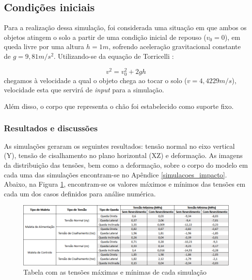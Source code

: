 \subsection{Condições iniciais}

\par Para a realização dessa simulação, foi considerada uma situação em que ambos os objetos atingem o solo a partir de uma condição inicial de repouso ($v_0 = 0$), em queda livre por uma altura $h = 1m$, sofrendo aceleração gravitacional constante de $g = 9,81 m/s^2$. Utilizando-se da equação de Torricelli \cite{hughd.young;rogera.freedman2008}:

\begin{equation}
    v^2 = v_0^2 + 2gh
\end{equation}
chegamos à velocidade a qual o objeto chega ao tocar o solo ($v = 4,4229 m/s$), velocidade esta que servirá de \textit{input} para a simulação.
\par Além disso, o corpo que representa o chão foi estabelecido como suporte fixo.



\subsubsection{Resultados e discussões}

As simulações geraram os seguintes resultados: tensão normal no eixo vertical (Y), tensão de cisalhamento no plano horizontal (XZ) e deformação. As imagens da distribuição das tensões, bem como a deformação, sobre o corpo do modelo em cada uma das simulações encontram-se no Apêndice \ref{simulacoes_impacto}. Abaixo, na Figura \ref{tabelaSimulacao}, encontram-se os valores máximos e mínimos das tensões em cada um dos casos definidos para análise numérica.


\begin{figure}[H]
	\centering

		\includegraphics[width=1\textwidth]{figuras/estrutura_simulacaoImpacto/tabelaSimulacao.png}
	\caption{Tabela com as tensões máximas e mínimas de cada simulação}
	\label{tabelaSimulacao}
	\end{figure}

